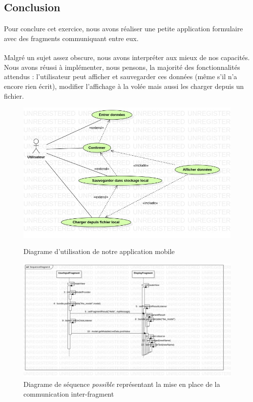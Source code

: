 \documentclass[a4paper]{article}
\begin{document}
\begin{multicols}{2}
        \section{Conclusion}
            \paragraph{}
                Pour conclure cet exercice, nous avons réaliser une petite application formulaire avec des fragments communiquant entre eux.
            \paragraph{}
                Malgré un sujet assez obscure, nous avons interpréter aux mieux de nos capacités. Nous avons réussi à implémenter, nous pensons, la majorité des fonctionnalités attendus : l'utilisateur peut afficher et sauvegarder ces données (même s'il n'a encore rien écrit), modifier l'affichage à la volée mais aussi les charger depuis un fichier.
        \begin{figure}
            \centering
            \caption{Diagrame d'utilisation de notre application mobile}
            \includegraphics[width=.8\textwidth]{jpg/useCase}
            \label{fig:useCase}
        \end{figure}
        \begin{figure}
            \centering
            \caption{Diagrame de séquence \emph{possible} représentant la mise en place de la communication inter-fragment}
            \includegraphics[width=.8\textwidth]{jpg/sequence}

\end{figure}
\end{multicols}
\end{document}
